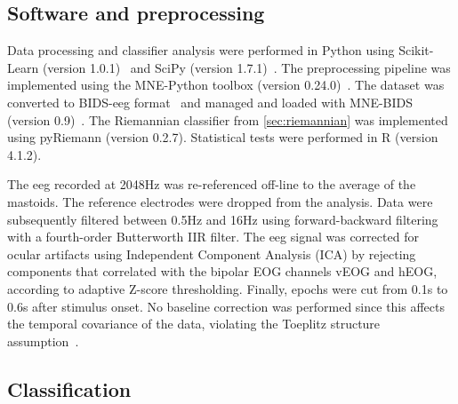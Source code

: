 	\subsection{Software and preprocessing}
	Data processing and classifier analysis were performed in Python using
	Scikit-Learn (version 1.0.1)~\cite{Pedregosa2011} and SciPy (version
	1.7.1)~\cite{Virtanen2020}.
	The preprocessing pipeline was implemented using the MNE-Python toolbox
	(version 0.24.0)~\cite{Gramfort2013}.
	The dataset was converted to BIDS-\ac{eeg} format~\cite{Pernet2019} and managed and
	loaded with MNE-BIDS (version 0.9)~\cite{Appelhoff2019}.
	The Riemannian classifier from \cref{sec:riemannian} was implemented using
	pyRiemann (version 0.2.7).
	Statistical tests were performed in R (version 4.1.2).

	The \ac{eeg} recorded at 2048Hz was re-referenced off-line to the average of the mastoids.
	The reference electrodes were dropped from the analysis.
	Data were subsequently filtered between 0.5Hz and 16Hz using forward-backward
	filtering with a fourth-order Butterworth IIR filter.
	The \ac{eeg} signal was corrected for ocular artifacts using Independent Component
	Analysis (ICA) by rejecting components that correlated with the bipolar EOG channels vEOG and hEOG, according to adaptive Z-score thresholding.
	Finally, epochs were cut from 0.1s to 0.6s after stimulus onset.
	No baseline correction was performed since this affects the temporal covariance
	of the data, violating the Toeplitz structure assumption~\cite{Bijma2003}.

	\subsection{Classification}
